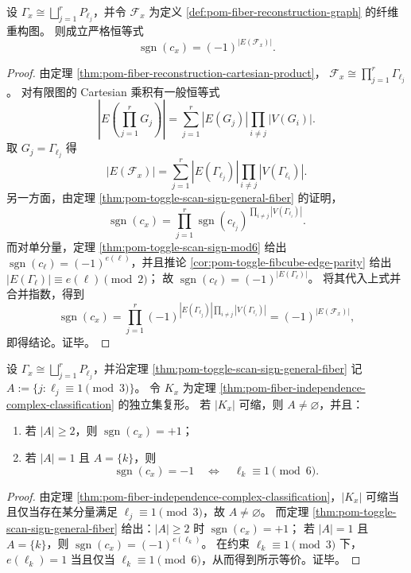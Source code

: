 \begin{theorem}[扫描元符号的边数奇偶刻画]\label{thm:pom-toggle-scan-sign-edge-parity}
设 \(\Gamma_x\cong\bigsqcup_{j=1}^r P_{\ell_j}\)，并令 \(\mathcal F_x\) 为定义 \ref{def:pom-fiber-reconstruction-graph} 的纤维重构图。
则成立严格恒等式
\[
\operatorname{sgn}(c_x)=(-1)^{|E(\mathcal F_x)|}.
\]
\end{theorem}
\begin{proof}
由定理 \ref{thm:pom-fiber-reconstruction-cartesian-product}，
\(
\mathcal F_x\cong\prod_{j=1}^r \Gamma_{\ell_j}
\)。
对有限图的 Cartesian 乘积有一般恒等式
\[
|E(\textstyle\prod_{j=1}^r G_j)|
=\sum_{j=1}^r |E(G_j)|\prod_{i\ne j}|V(G_i)|.
\]
取 \(G_j=\Gamma_{\ell_j}\) 得
\[
|E(\mathcal F_x)|
=\sum_{j=1}^r |E(\Gamma_{\ell_j})|\prod_{i\ne j}|V(\Gamma_{\ell_i})|.
\]
另一方面，由定理 \ref{thm:pom-toggle-scan-sign-general-fiber} 的证明，
\[
\operatorname{sgn}(c_x)=\prod_{j=1}^r \operatorname{sgn}(c_{\ell_j})^{\prod_{i\ne j}|V(\Gamma_{\ell_i})|}.
\]
而对单分量，定理 \ref{thm:pom-toggle-scan-sign-mod6} 给出 \(\operatorname{sgn}(c_\ell)=(-1)^{e(\ell)}\)，并且推论 \ref{cor:pom-toggle-fibcube-edge-parity} 给出
\(
|E(\Gamma_\ell)|\equiv e(\ell)\pmod 2
\)；
故
\(
\operatorname{sgn}(c_\ell)=(-1)^{|E(\Gamma_\ell)|}
\)。
将其代入上式并合并指数，得到
\[
\operatorname{sgn}(c_x)
=\prod_{j=1}^r (-1)^{|E(\Gamma_{\ell_j})|\prod_{i\ne j}|V(\Gamma_{\ell_i})|}
=(-1)^{|E(\mathcal F_x)|},
\]
即得结论。证毕。
\end{proof}

\begin{corollary}[可缩纤维中的偶性刚性]\label{cor:pom-toggle-contractible-parity-rigidity}
设 \(\Gamma_x\cong\bigsqcup_{j=1}^r P_{\ell_j}\)，并沿定理 \ref{thm:pom-toggle-scan-sign-general-fiber} 记 \(A:=\{j:\ell_j\equiv 1\pmod 3\}\)。
令 \(K_x\) 为定理 \ref{thm:pom-fiber-independence-complex-classification} 的独立集复形。
若 \(|K_x|\) 可缩，则 \(A\neq\varnothing\)，并且：
\begin{enumerate}
  \item 若 \(|A|\ge 2\)，则 \(\operatorname{sgn}(c_x)=+1\)；
  \item 若 \(|A|=1\) 且 \(A=\{k\}\)，则
  \[
  \operatorname{sgn}(c_x)=-1
  \quad\Longleftrightarrow\quad
  \ell_k\equiv 1\pmod 6.
  \]
\end{enumerate}
\end{corollary}
\begin{proof}
由定理 \ref{thm:pom-fiber-independence-complex-classification}，\(|K_x|\) 可缩当且仅当存在某分量满足 \(\ell_j\equiv 1\pmod 3\)，故 \(A\neq\varnothing\)。
而定理 \ref{thm:pom-toggle-scan-sign-general-fiber} 给出：\(|A|\ge 2\) 时 \(\operatorname{sgn}(c_x)=+1\)；
若 \(|A|=1\) 且 \(A=\{k\}\)，则 \(\operatorname{sgn}(c_x)=(-1)^{e(\ell_k)}\)。
在约束 \(\ell_k\equiv 1\pmod 3\) 下，\(e(\ell_k)=1\) 当且仅当 \(\ell_k\equiv 1\pmod 6\)，从而得到所示等价。证毕。
\end{proof}

